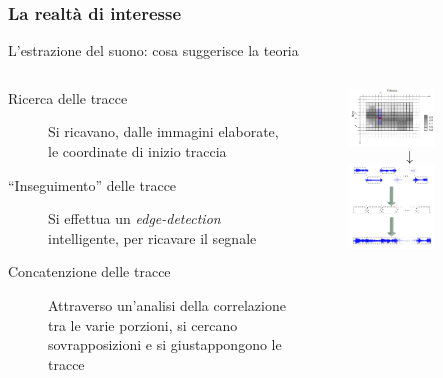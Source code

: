 \begin{frame}
\frametitle{La realtà di interesse}
\begin{block}{L'estrazione del suono: cosa suggerisce la teoria}
\begin{columns}
\begin{column}{6.5cm}
\begin{description}
\item[Ricerca delle tracce] Si ricavano, dalle immagini elaborate, le coordinate
di inizio traccia
\item[``Inseguimento'' delle tracce] Si effettua un \emph{edge-detection}
intelligente, per ricavare il segnale
\item[Concatenzione delle tracce] Attraverso un'analisi della correlazione
tra le varie porzioni, si cercano sovrapposizioni e si giustappongono le 
tracce
\end{description}
\end{column}
\vline
\begin{column}{3.5cm}
\begin{figure}
\includegraphics[width=0.7\textwidth]{immagini/track-following.png}
$$\downarrow$$
\vspace{0.2cm}
\includegraphics[width=0.7\textwidth]{immagini/concatenation.png}
\end{figure}
\end{column}
\end{columns}
\end{block}
\end{frame}
